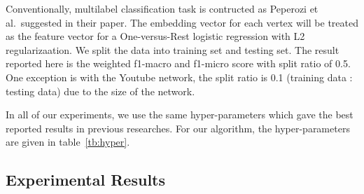 \documentclass[letterpaper]{article}
\begin{document}
            Conventionally, multilabel classification task is contructed as Peperozi et al.\ suggested
            in their paper. The embedding vector for each vertex will be treated as the feature
            vector for a One-versus-Rest logistic regression with L2 regularizaation. We split the 
            data into training set and testing set. The result reported here is the weighted f1-macro and
            f1-micro score with split ratio of 0.5. One exception is with the Youtube network, the
            split ratio is 0.1 (training data : testing data) due to the size of the network.

            In all of our experiments, we use the same hyper-parameters which gave the best
            reported results in previous researches. For our algorithm, the hyper-parameters
            are given in table~\ref{tb:hyper}.


            \begin{table}
                \centering
                \label{tb:hyper}
                \caption{MAGE Hyper-parameters}
            \end{table}

        \subsection{Experimental Results}
\end{document}
